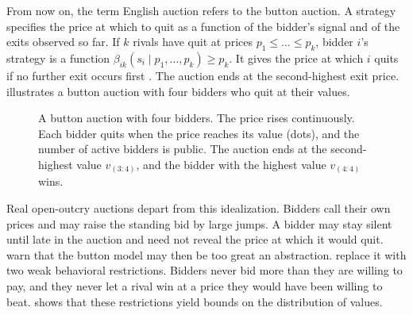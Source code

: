 From now on, the term English auction refers to the button auction. A strategy specifies the price at which
to quit as a function of the bidder's signal and of the exits observed so far. If $k$ rivals have quit at
prices $p_1\le\dots\le p_k$, bidder $i$'s strategy is a function $\beta_{ik}(s_i\mid p_1,\dots,p_k)\ge p_k$.
It gives the price at which $i$ quits if no further exit occurs first \citep[p.~1104]{MilgromWeber1982}.
The auction ends at the second-highest exit price.  illustrates a button auction with
four bidders who quit at their values.

\begin{figure}[htbp]
\centering
{}
\caption{A button auction with four bidders. The price rises continuously. Each bidder quits when the price
reaches its value (dots), and the number of active bidders is public. The auction ends at the
second-highest value $v_{(3:4)}$, and the bidder with the highest value $v_{(4:4)}$ wins.}
\label{fig:14-button}
\end{figure}

Real open-outcry auctions depart from this idealization. Bidders call their own prices and may raise the
standing bid by large jumps. A bidder may stay silent until late in the auction and need not reveal the
price at which it would quit. \citet[Section~2.2.2]{AtheyHaile2007} warn that the button model may then be
too great an abstraction. \citet{HaileTamer2003} replace it with two weak behavioral restrictions. Bidders
never bid more than they are willing to pay, and they never let a rival win at a price they would have been
willing to beat.  shows that these restrictions yield bounds on the distribution
of values.

